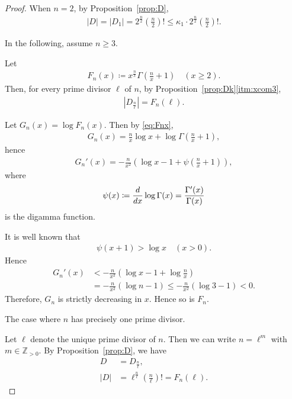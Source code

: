 \documentclass[12pt,reqno]{amsart}
\newcommand{\Zp}{\mathbb{Z}_{> 0}}						%
\newcommand{\HL}{\vspace{2mm}}							%
\newcommand{\q}{\quad}									%
\newcommand{\f}[2]{\frac{#1}{#2}}							%
\newcommand{\ceq}{\coloneqq} 							%
\newcommand{\vt}[1]{\left\lvert #1 \right\rvert}					%
\theoremstyle{mythmstyle}
\theoremstyle{mydefstyle}
\newcommand{\propref}[1]{Proposition~\ref{#1}}
\numberwithin{equation}{section}
\begin{document}
\begin{proof}
When $n = 2$, by \propref{prop:D},
\begin{align}
\vt{D} = \vt{D_{1}} = 2^{\f{n}{2}}\left(\f{n}{2}\right)! \le \kappa_{1}\cdot 2^{\f{n}{2}}\left(\f{n}{2}\right)! .
\end{align}

In the following, assume $n \ge 3$.

Let
\begin{align}
\label{eq:Fnx}
F_{n}(x) \ceq x^{\f{n}{x}}\Gamma\left(\f{n}{x}+1\right)\q (x \ge 2).
\end{align}
Then, for every prime divisor $\ell$ of $n$, by \propref{prop:Dk}\ref{itm:xcom3},
\begin{align}
\vt{D_{\f{n}{\ell}}} = F_{n}(\ell).
\end{align}

Let $G_{n}(x) = \log F_{n}(x)$. Then by \eqref{eq:Fnx},
\begin{align}
G_{n}(x) = \f{n}{x}\log x + \log \Gamma\left(\f{n}{x}+1\right),
\end{align}
hence
\begin{align}
G_{n}'(x) = -\f{n}{x^{2}}\left(\log x - 1 + \psi\left(\f{n}{x}+1\right)\right),
\end{align}
where
\begin{align}
\psi(x) \ceq \dv{x} \log \Gamma(x) = \f{\Gamma'(x)}{\Gamma(x)}
\end{align}
is the digamma function.

It is well known that
\begin{align}
\psi(x+1) > \log x \q (x>0).
\end{align}
Hence
\begin{align}
G_{n}'(x) &< -\f{n}{x^{2}}\left(\log x - 1 + \log \f{n}{x}\right) \\
&= -\f{n}{x^{2}}(\log n - 1) \le -\f{n}{x^{2}}(\log 3 - 1) < 0.
\end{align}
Therefore, $G_n$ is strictly decreasing in $x$. Hence so is $F_n$.
\HL

\item[(i)] The case where $n$ has precisely one prime divisor.

Let $\ell$ denote the unique prime divisor of $n$. Then we can write $n = \ell^{m}$ with
$m \in \Zp$. By \propref{prop:D}, we have
\begin{align}
D &= D_{\f{n}{\ell}}, \\
\vt{D} &= \ell^{\f{n}{\ell}}\left(\f{n}{\ell}\right)! = F_{n}(\ell).
\end{align}


\end{proof}
\end{document}
